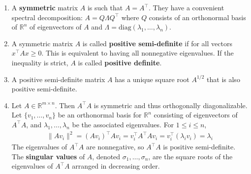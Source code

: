 \documentclass[10pt]{article}
\begin{document}
\begin{multicols}{2}
\begin{addmargin}[0.8em]{0.5em}
\begin{enumerate}[label=(\alph*)]
        \item A \textbf{symmetric} matrix $A$ is such that $A=A^\top$. They have a convenient spectral decomposition: $A = Q \Lambda Q^\top$ where $Q$ consists of an orthonormal basis of $\mathbb{R}^n$ of eigenvectors of $A$ and $\Lambda = \text{diag}(\lambda_1, \hdots, \lambda_n)$.
        
        \item A symmetric matrix $A$ is called \textbf{positive semi-definite} if for all vectors $x^\top A x \geq 0$. This is equivalent to having all nonnegative eigenvalues. If the inequality is strict, $A$ is called \textbf{positive definite}.
        
        \item A positive semi-definite matrix $A$ has a unique square root $A^{1/2}$ that is also positive semi-definite.
        
        \item Let $A \in \mathbb{R}^{m \times n}$. Then $A^\top A$ is symmetric and thus orthogonally diagonalizable. Let $\{ v_1, \hdots, v_n \}$ be an orthonormal basis for $\mathbb{R}^n$ consisting of eigenvectors of $A^\top A$, and $\lambda_1, \hdots, \lambda_n$ be the associated eigenvalues. For $1 \leq i \leq n$,
        \begin{align*}
            \| Av_i \|^2 = (Av_i)^\top Av_i = v_i^\top A^\top A v_i = v_i^\top (\lambda_i v_i) = \lambda_i
        \end{align*}
        The eigenvalues of $A^\top A$ are nonnegative, so $A^\top A$ is positive semi-definite. The \textbf{singular values} of $A$, denoted $\sigma_1, \hdots, \sigma_n$,  are the square roots of the eigenvalues of $A^\top A$ arranged in decreasing order.
        

\end{enumerate}
\end{addmargin}
\end{multicols}
\end{document}
